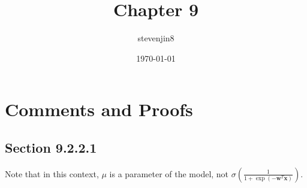 \documentclass[a4paper,11pt]{article}
\title{Chapter 9}
\author{stevenjin8}
\date{\today}
\begin{document}
\maketitle

\section*{Comments and Proofs}
\subsection*{Section 9.2.2.1}
Note that in this context, $\mu$ is a parameter of the model,
not $\sigma(\frac{1}{1+\exp(-\mathbf{w}^T\mathbf{x})})$.
\end{document}
